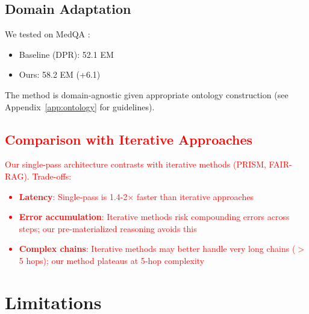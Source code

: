 \documentclass[10pt,twocolumn]{article}
\newcommand{\revisioncritical}[1]{\textcolor{red}{#1}}
\begin{document}
\subsection{Domain Adaptation}

We tested on MedQA \cite{jin2021medqa}:
\begin{itemize}
    \item Baseline (DPR): 52.1 EM
    \item Ours: 58.2 EM (+6.1)
\end{itemize}

The method is domain-agnostic given appropriate ontology construction (see Appendix~\ref{app:ontology} for guidelines).

\revisioncritical{
\subsection{Comparison with Iterative Approaches}

Our single-pass architecture contrasts with iterative methods (PRISM, FAIR-RAG). Trade-offs:

\begin{itemize}
    \item \textbf{Latency}: Single-pass is 1.4-2$\times$ faster than iterative approaches
    \item \textbf{Error accumulation}: Iterative methods risk compounding errors across steps; our pre-materialized reasoning avoids this
    \item \textbf{Complex chains}: Iterative methods may better handle very long chains ($>$5 hops); our method plateaus at 5-hop complexity
\end{itemize}
}

\section{Limitations}
\end{document}
